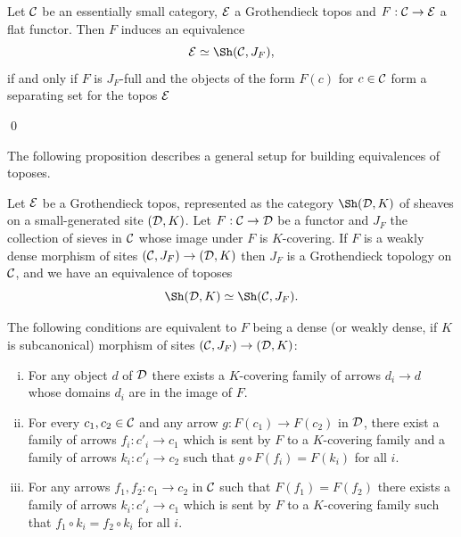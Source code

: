 \documentclass[a4paper,12pt]{article}
\begin{document}
\begin{corollary}\label{corflatequivalenceinducedtopology}
	Let ${\cal C}$ be an essentially small category, $\cal E$ a Grothendieck topos and $F:{\cal C}\to {\cal E}$ a flat functor. Then $F$ induces an equivalence 
	\[
	{\cal E}\simeq \Sh({\cal C}, J_{F}),
	\]
	if and only if $F$ is $J_{F}$-full and the objects of the form $F(c)$ for $c\in {\cal C}$ form a separating set for the topos $\cal E$
\end{corollary}\qed

The following proposition describes a general setup for building equivalences of toposes. 

\begin{proposition}\label{propgeneratingequivalence}
	Let $\cal E$ be a Grothendieck topos, represented as the category $\Sh({\cal D}, K)$ of sheaves on a small-generated site $({\cal D}, K)$. Let $F:{\cal C}\to {\cal D}$ be a functor and $J_{F}$ the collection of sieves in $\cal C$ whose image under $F$ is $K$-covering. If $F$ is a weakly dense morphism of sites $({\cal C}, J_{F})\to ({\cal D}, K)$ then $J_{F}$ is a Grothendieck topology on $\cal C$, and we have an equivalence of toposes 
	\[
	\Sh({\cal D}, K) \simeq \Sh({\cal C}, J_{F}).
	\]
	
	The following conditions are equivalent to $F$ being a dense (or weakly dense, if $K$ is subcanonical) morphism of sites $({\cal C}, J_{F})\to ({\cal D}, K)$:
	\begin{enumerate}[(i)]
		\item[(i)'] For any object $d$ of $\cal D$ there exists a $K$-covering family of arrows $d_{i}\to d$ whose domains $d_{i}$ are in the image of $F$.
		
		\item[(ii)'] For every $c_{1}, c_{2}\in {\cal C}$ and any arrow $g:F(c_{1})\to F(c_{2})$ in $\cal D$, there exist a family of arrows $f_{i}:c'_{i}\to c_{1}$ which is sent by $F$ to a $K$-covering family and a family of arrows $k_{i}:c'_{i}\to c_{2}$ such that $g\circ F(f_{i})=F(k_{i})$ for all $i$. 
		
		\item[(iii)'] For any arrows $f_{1}, f_{2}:c_{1}\to c_{2}$ in $\cal C$ such that $F(f_1)=F(f_2)$ there exists a family of arrows $k_{i}:c'_{i}\to c_{1}$ which is sent by $F$ to a $K$-covering family such that $f_1 \circ k_{i}=f_{2}\circ k_{i}$ for all $i$.	
	\end{enumerate}
\end{proposition} 
\end{document}
